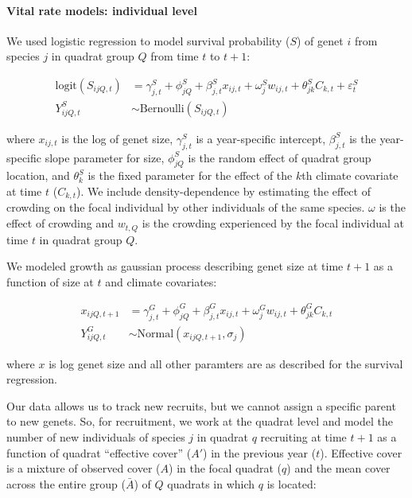 \documentclass[12pt,]{article}
\begin{document}
\paragraph{Vital rate models: individual
level}\label{vital-rate-models-individual-level}

We used logistic regression to model survival probability ($S$) of genet
$i$ from species $j$ in quadrat group $Q$ from time $t$ to $t+1$:

\begin{align}
\text{logit}(S_{ijQ,t}) &= \gamma^{S}_{j,t} + \phi^{S}_{jQ} + \beta^{S}_{j,t}x_{ij,t} + \omega^{S}_{j}w_{ij,t} + \theta^{S}_{jk}C_{k,t} + \varepsilon^{S}_{t} \\
Y^{S}_{ijQ,t} &\sim \text{Bernoulli}(S_{ijQ,t})
\end{align}

where $x_{ij,t}$ is the log of genet size, $\gamma^{S}_{j,t}$ is a
year-specific intercept, $\beta^{S}_{j,t}$ is the year-specific slope
parameter for size, $\phi^{S}_{jQ}$ is the random effect of quadrat
group location, and $\theta^{S}_{k}$ is the fixed parameter for the
effect of the $k$th climate covariate at time $t$ ($C_{k,t}$). We
include density-dependence by estimating the effect of crowding on the
focal individual by other individuals of the same species. $\omega$ is
the effect of crowding and $w_{t,Q}$ is the crowding experienced by the
focal individual at time $t$ in quadrat group $Q$.

We modeled growth as gaussian process describing genet size at time
$t+1$ as a function of size at $t$ and climate covariates:

\begin{align}
x_{ijQ,t+1} &= \gamma^{G}_{j,t} + \phi^{G}_{jQ} + \beta^{G}_{j,t}x_{ij,t} + \omega^{G}_{j}w_{ij,t} + \theta^{G}_{jk}C_{k,t} \\
Y^{G}_{ijQ,t} &\sim \text{Normal}(x_{ijQ,t+1}, \sigma_{j})
\end{align}

where $x$ is log genet size and all other paramters are as described for
the survival regression.

Our data allows us to track new recruits, but we cannot assign a
specific parent to new genets. So, for recruitment, we work at the
quadrat level and model the number of new individuals of species $j$ in
quadrat $q$ recruiting at time $t+1$ as a function of quadrat
``effective cover'' ($A'$) in the previous year ($t$). Effective cover
is a mixture of observed cover ($A$) in the focal quadrat ($q$) and the
mean cover across the entire group ($\bar{A}$) of $Q$ quadrats in which
$q$ is located:
\end{document}
